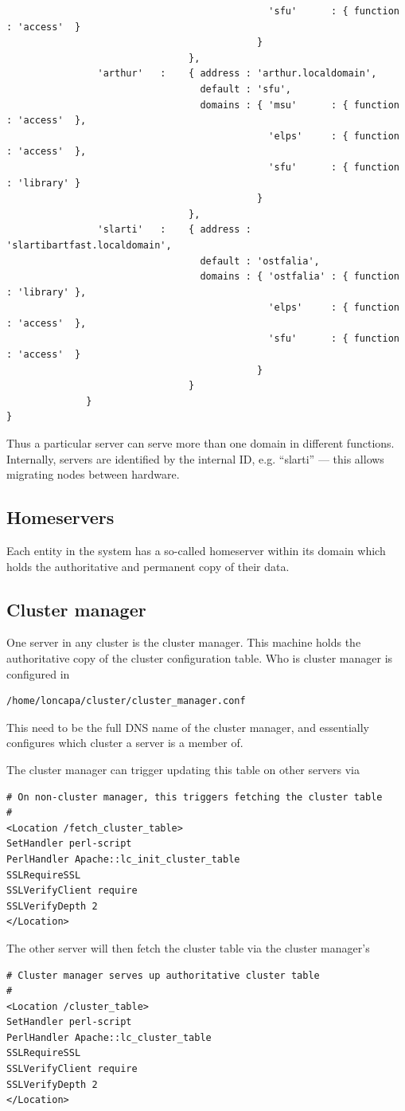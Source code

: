 \begin{verbatim}
                                              'sfu'      : { function : 'access'  }
                                            }
                                },
                'arthur'   :    { address : 'arthur.localdomain',
                                  default : 'sfu',
                                  domains : { 'msu'      : { function : 'access'  },
                                              'elps'     : { function : 'access'  },
                                              'sfu'      : { function : 'library' }
                                            }
                                },
                'slarti'   :    { address : 'slartibartfast.localdomain',
                                  default : 'ostfalia',
                                  domains : { 'ostfalia' : { function : 'library' },
                                              'elps'     : { function : 'access'  },
                                              'sfu'      : { function : 'access'  }
                                            }
                                }
              }
}
\end{verbatim}
Thus a particular server can serve more than one domain in different functions. Internally, servers are identified by the internal ID, e.g. ``slarti'' --- this allows migrating nodes between hardware.
\subsection{Homeservers}\label{homeserver}
Each entity in the system has a so-called homeserver within its domain which holds the authoritative and permanent copy of their data.
\subsection{Cluster manager}
One server in any cluster is the cluster manager. This machine holds the authoritative copy of the cluster configuration table. 
Who is cluster manager is configured in
\begin{verbatim}
/home/loncapa/cluster/cluster_manager.conf
\end{verbatim}
This need to be the full DNS name of the cluster manager, and essentially configures which cluster a server is a member of.

The cluster manager can trigger updating this table on other servers via
\begin{verbatim}
# On non-cluster manager, this triggers fetching the cluster table
#
<Location /fetch_cluster_table>
SetHandler perl-script
PerlHandler Apache::lc_init_cluster_table
SSLRequireSSL
SSLVerifyClient require
SSLVerifyDepth 2
</Location>
\end{verbatim}
The other server will then fetch the cluster table via the cluster manager's
\begin{verbatim}
# Cluster manager serves up authoritative cluster table
#
<Location /cluster_table>
SetHandler perl-script
PerlHandler Apache::lc_cluster_table
SSLRequireSSL
SSLVerifyClient require
SSLVerifyDepth 2
</Location>
\end{verbatim}
